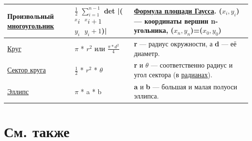 \documentclass[a4paper,8pt,leqno]{article}
\theoremstyle{plain}
\theoremstyle{definition} %
\theoremstyle{remark} %
\begin{document}
\begin{table}[]
\begin{tabular}{|p{4cm}|p{7cm}|p{4cm}|}
	Произвольный \href{https://ru.wikipedia.org/wiki/\%D0\%9F\%D1\%80\%D0\%B0\%D0\%B2\%D0\%B8\%D0\%BB\%D1\%8C\%D0\%BD\%D1\%8B\%D0\%B9\_\%D0\%BC\%D0\%BD\%D0\%BE\%D0\%B3\%D0\%BE\%D1\%83\%D0\%B3\%D0\%BE\%D0\%BB\%D1\%8C\%D0\%BD\%D0\%B8\%D0\%BA}{многоугольник} 	& $\frac{1}{2}$ $\sum_{i=1}^{n-1}$ det |($^xi~~~^xi+1$ $y_i~~~y_i+1$)| & \href{https://ru.wikipedia.org/wiki/\%D0\%A4\%D0\%BE\%D1\%80\%D0\%BC\%D1\%83\%D0\%BB\%D0\%B0\_\%D0\%BF\%D0\%BB\%D0\%BE\%D1\%89\%D0\%B0\%D0\%B4\%D0\%B8\_\%D0\%93\%D0\%B0\%D1\%83\%D1\%81\%D1\%81\%D0\%B0}{Формула площади Гаусса}. ($x_i, y_i$) — координаты вершин n-угольника, ($x_n, y_n$)=($x_0,y_0$)           \\ \hline
	\href{https://ru.wikipedia.org/wiki/\%D0\%9A\%D1\%80\%D1\%83\%D0\%B3}{Круг}	& $\pi$ * $r^2$ или $\frac{\pi * d^2}{4}$ & \textbf{r} — радиус окружности, а \textbf{d} — её диаметр.  \\ \hline
	\href{https://ru.wikipedia.org/wiki/\%D0\%A1\%D0\%B5\%D0\%BA\%D1\%82\%D0\%BE\%D1\%80\_(\%D0\%B3\%D0\%B5\%D0\%BE\%D0\%BC\%D0\%B5\%D1\%82\%D1\%80\%D0\%B8\%D1\%8F)}{Сектор круга}	& $\frac{1}{2}$ * $r^2$ * $\theta$ & \textbf{r} и $\theta$  — соответственно радиус и угол сектора (в \href{https://ru.wikipedia.org/wiki/\%D0\%A0\%D0\%B0\%D0\%B4\%D0\%B8\%D0\%B0\%D0\%BD\%D1\%8B}{радианах}). \\ \hline
	\href{https://ru.wikipedia.org/wiki/\%D0\%AD\%D0\%BB\%D0\%BB\%D0\%B8\%D0\%BF\%D1\%81}{Эллипс} & $\pi$ * a * b & \textbf{a} и \textbf{b} — большая и малая полуоси эллипса. \\ \hline
	\end{tabular}
\end{table}

\section{См. также}
\end{document}

